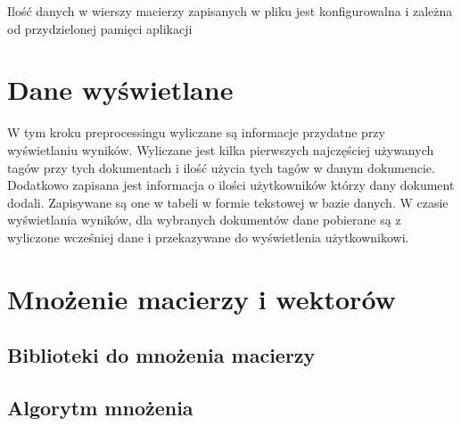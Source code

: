 \documentclass[11pt,a4paper]{report}
\begin{document}
Ilość danych w wierszy macierzy zapisanych w pliku jest konfigurowalna i zależna od przydzielonej pamięci aplikacji



\section{Dane wyświetlane}
W tym kroku preprocessingu wyliczane są informacje przydatne przy wyświetlaniu wyników. Wyliczane jest kilka pierwszych najczęściej używanych tagów przy tych dokumentach i ilość użycia tych tagów w danym dokumencie. Dodatkowo zapisana jest informacja o ilości użytkowników którzy dany dokument dodali. Zapisywane są one w tabeli w formie tekstowej w bazie danych. W czasie wyświetlania wyników, dla wybranych dokumentów dane pobierane są z wyliczone wcześniej dane i przekazywane do wyświetlenia użytkownikowi. 



\section{Mnożenie macierzy i wektorów}
\subsection{Biblioteki do mnożenia macierzy}
\subsection{Algorytm mnożenia}
\end{document}
